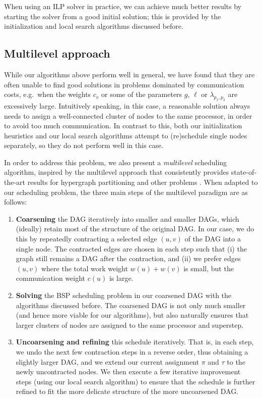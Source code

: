 \documentclass[sigconf,nonacm]{acmart}
\begin{document}
When using an ILP solver in practice, we can achieve much better results by starting the solver from a good initial solution; this is provided by the initialization and local search algorithms discussed before.

\subsection{Multilevel approach}

While our algorithms above perform well in general, we have found that they are often unable to find good solutions in problems dominated by communication costs, e.g.\ when the weights $c_v$ or some of the parameters $g$, $\ell$ or $\lambda_{p_1, p_2}$ are excessively large. Intuitively speaking, in this case, a reasonable solution always needs to assign a well-connected cluster of nodes to the same processor, in order to avoid too much communication. In contrast to this, both our initialization heuristics and our local search algorithms attempt to (re)schedule single nodes separately, so they do not perform well in this case.

In order to address this problem, we also present a \emph{multilevel} scheduling algorithm, inspired by the multilevel approach that consistently provides state-of-the-art results for hypergraph partitioning and other problems \cite{multi1, multi2, multi3, DAH}. When adapted to our scheduling problem, the three main steps of the multilevel paradigm are as follows:
\begin{enumerate}[topsep=4pt,itemsep=0pt,partopsep=2pt,parsep=7pt]
    \item \textbf{Coarsening} the DAG iteratively into smaller and smaller DAGs, which (ideally) retain most of the structure of the original DAG. In our case, we do this by repeatedly contracting a selected edge $(u,v)$ of the DAG into a single node. The contracted edges are chosen in each step such that (i) the graph still remains a DAG after the contraction, and (ii) we prefer edges $(u,v)$ where the total work weight $w(u)+w(v)$ is small, but the communication weight $c(u)$ is large. 
    \item \textbf{Solving} the BSP scheduling problem in our coarsened DAG with the algorithms discussed before. The coarsened DAG is not only much smaller (and hence more viable for our algorithms), but also naturally ensures that larger clusters of nodes are assigned to the same processor and superstep.
    \item \textbf{Uncoarsening and refining} this schedule iteratively. That is, in each step, we undo the next few contraction steps in a reverse order, thus obtaining a slightly larger DAG, and we extend our current assignment $\pi$ and $\tau$ to the newly uncontracted nodes. We then execute a few iterative improvement steps (using our local search algorithm) to ensure that the schedule is further refined to fit the more delicate structure of the more uncoarsened DAG.
\end{enumerate}
\end{document}
